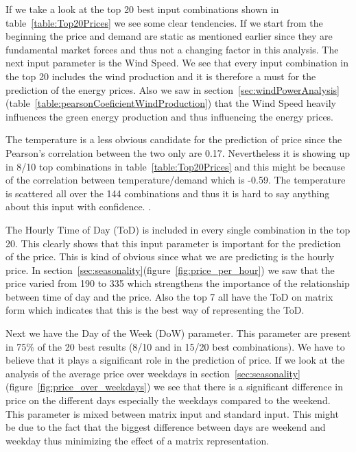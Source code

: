 If we take a look at the top 20 best input combinations shown in table~\ref{table:Top20Prices} we see some clear tendencies. If we start from the beginning the price and demand are static as mentioned earlier since they are fundamental market forces and thus not a changing factor in this analysis. The next input parameter is the Wind Speed. We see that every input combination in the top 20 includes the wind production and it is therefore a must for the prediction of the energy prices. Also we saw in section~\ref{sec:windPowerAnalysis}(table~\ref{table:pearsonCoeficientWindProduction}) that the Wind Speed heavily influences the green energy production and thus influencing the energy prices. 

The temperature is a less obvious candidate for the prediction of price since the Pearson's correlation between the two only are 0.17. Nevertheless it is showing up in 8/10 top combinations in table~\ref{table:Top20Prices} and this might be because of the correlation between temperature/demand which is -0.59. The temperature is scattered all over the 144 combinations and thus it is hard to say anything about this input with confidence. .

The Hourly Time of Day (ToD) is included in every single combination in the top 20. This clearly shows that this input parameter is important for the prediction of the price. This is kind of obvious since what we are predicting is the hourly price. In section~\ref{sec:seasonality}(figure~\ref{fig:price_per_hour}) we saw that the price varied from 190 to 335 which strengthens the importance of the relationship between time of day and the price. Also the top 7 all have the ToD on matrix form which indicates that this is the best way of representing the ToD.

Next we have the Day of the Week (DoW) parameter. This parameter are present in 75\% of the 20 best results (8/10 and in 15/20 best combinations). We have to believe that it plays a significant role in the prediction of price. If we look at the analysis of the average price over weekdays in section~\ref{sec:seasonality}(figure~\ref{fig:price_over_weekdays}) we see that there is a significant difference in price on the different days especially the weekdays compared to the weekend. This parameter is mixed between matrix input and standard input. This might be due to the fact that the biggest difference between days are weekend and weekday thus minimizing the effect of a matrix representation. 


